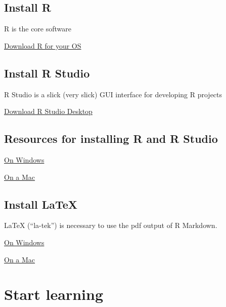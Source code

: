 \documentclass[]{book}
\begin{document}
\hypertarget{install-r}{%
\subsection{Install R}\label{install-r}}

R is the core software

\href{https://cran.r-project.org}{Download R for your OS}

\hypertarget{install-r-studio}{%
\subsection{Install R Studio}\label{install-r-studio}}

R Studio is a slick (very slick) GUI interface for developing R projects

\href{https://www.rstudio.com/products/rstudio/download/}{Download R Studio Desktop}

\hypertarget{resources-for-installing-r-and-r-studio}{%
\subsection{Resources for installing R and R Studio}\label{resources-for-installing-r-and-r-studio}}

\href{https://medium.com/@GalarnykMichael/install-r-and-rstudio-on-windows-5f503f708027}{On Windows}

\href{https://medium.com/@GalarnykMichael/install-r-and-rstudio-on-mac-e911606ce4f4}{On a Mac}

\hypertarget{install-latex}{%
\subsection{Install LaTeX}\label{install-latex}}

LaTeX (``la-tek'') is necessary to use the pdf output of R Markdown.

\href{https://medium.com/@sorenlind/create-pdf-reports-using-r-r-markdown-latex-and-knitr-on-windows-10-952b0c48bfa9}{On Windows}

\href{https://medium.com/@sorenlind/create-pdf-reports-using-r-r-markdown-latex-and-knitr-on-macos-high-sierra-e7b5705c9fd}{On a Mac}

\hypertarget{start-learning}{%
\section{Start learning}\label{start-learning}}
\end{document}
